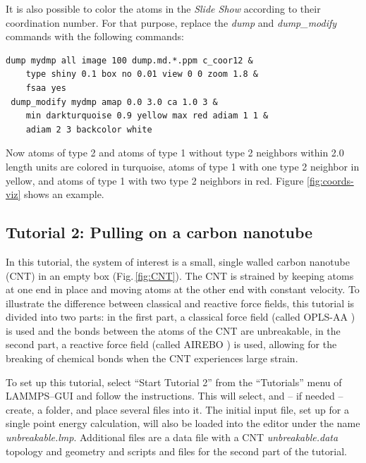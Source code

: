 \documentclass[9pt,tutorial]{livecoms}
\begin{document}
It is also possible to color the atoms in the \textit{Slide Show}
according to their coordination number. For that purpose, replace the
\textit{dump} and \textit{dump\_modify} commands with the following
commands:
\begin{lstlisting}
dump mydmp all image 100 dump.md.*.ppm c_coor12 &
    type shiny 0.1 box no 0.01 view 0 0 zoom 1.8 &
    fsaa yes
 dump_modify mydmp amap 0.0 3.0 ca 1.0 3 &
    min darkturquoise 0.9 yellow max red adiam 1 1 &
    adiam 2 3 backcolor white
\end{lstlisting}

Now atoms of type 2 and atoms of type 1 without type 2 neighbors
within 2.0 length units are colored in turquoise, atoms of type 1 with
one type 2 neighbor in yellow, and atoms of type 1 with two type 2
neighbors in red.  Figure \ref{fig:coords-viz} shows an example.

\subsection{Tutorial 2: Pulling on a carbon nanotube}
\label{carbon-nanotube-label}

In this tutorial, the system of interest is a small, single walled
carbon nanotube (CNT) in an empty box (Fig.\,\ref{fig:CNT}).  The CNT is
strained by keeping atoms at one end in place and moving atoms at the
other end with constant velocity.  To illustrate the difference between
classical \cite{typelabel_paper} and reactive force fields, this
tutorial is divided into two parts: in the first part, a classical force
field (called OPLS-AA \cite{jorgensenDevelopmentTestingOPLS1996}) is
used and the bonds between the atoms of the CNT are unbreakable, in the
second part, a reactive force field (called AIREBO
\cite{stuart2000reactive}) is used, allowing for the breaking of
chemical bonds when the CNT experiences large strain.

To set up this tutorial, select ``Start Tutorial 2'' from the
``Tutorials'' menu of LAMMPS--GUI and follow the instructions.  This
will select, and -- if needed -- create, a folder, and place several
files into it.  The initial input file, set up for a single point energy
calculation, will also be loaded into the editor under the name
\textit{unbreakable.lmp}.  Additional files are a data file with a CNT
\textit{unbreakable.data} topology and geometry and scripts and files
for the second part of the tutorial.
\end{document}
